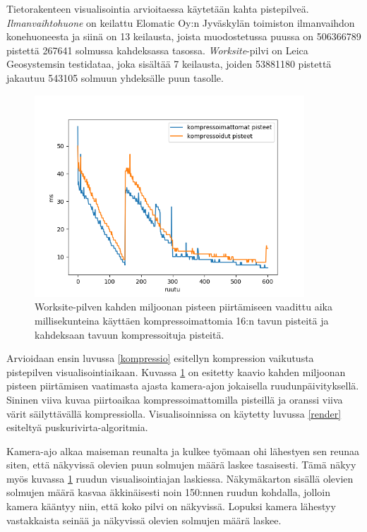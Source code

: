 Tietorakenteen visualisointia arvioitaessa käytetään kahta pistepilveä. \emph{Ilmanvaihtohuone} on keilattu Elomatic Oy:n Jyväskylän toimiston ilmanvaihdon konehuoneesta ja siinä on 13 keilausta, joista muodostetussa puussa on 506366789 pistettä 267641 solmussa kahdeksassa tasossa. \emph{Worksite}-pilvi on Leica Geosystemsin testidataa, joka sisältää 7 keilausta, joiden 53881180 pistettä jakautuu 543105 solmuun yhdeksälle puun tasolle. 

\begin{figure}[h]
    \centering
    \includegraphics[width=0.9\textwidth]{tuloksia/worksite_compressed_vs_uncompressed.png}
    \caption{Worksite-pilven kahden miljoonan pisteen piirtämiseen vaadittu aika millisekunteina käyttäen kompressoimattomia 16:n tavun pisteitä ja kahdeksaan tavuun kompressoituja pisteitä.}
    \label{ws_compr}
\end{figure}

Arvioidaan ensin luvussa \ref{kompressio} esitellyn kompression vaikutusta pistepilven visualisointiaikaan. Kuvassa \ref{ws_compr} on esitetty kaavio kahden miljoonan pisteen piirtämisen vaatimasta ajasta kamera-ajon jokaisella ruudunpäivityksellä. Sininen viiva kuvaa piirtoaikaa kompressoimattomilla pisteillä ja oranssi viiva värit säilyttävällä kompressiolla. Visualisoinnissa on käytetty luvussa \ref{render} esiteltyä puskurivirta-algoritmia. 

Kamera-ajo alkaa maiseman reunalta ja kulkee työmaan ohi lähestyen sen reunaa siten, että näkyvissä olevien puun solmujen määrä laskee tasaisesti. Tämä näkyy myös kuvassa \ref{ws_compr} ruudun visualisointiajan laskiessa. Näkymäkarton sisällä olevien solmujen määrä kasvaa äkkinäisesti noin 150:nnen ruudun kohdalla, jolloin kamera kääntyy niin, että koko pilvi on näkyvissä. Lopuksi kamera lähestyy vastakkaista seinää ja näkyvissä olevien solmujen määrä laskee. 

